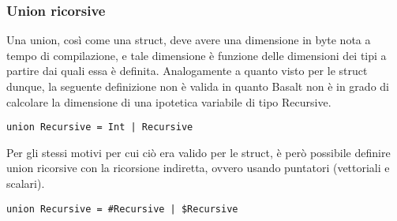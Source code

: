 
\subsubsection{Union ricorsive}
Una union, così come una struct, deve avere una dimensione in byte nota a tempo di compilazione, e tale dimensione è funzione delle dimensioni dei tipi a partire dai quali essa è definita. Analogamente a quanto visto per le struct dunque, la seguente definizione non è valida in quanto Basalt non è in grado di calcolare la dimensione di una ipotetica variabile di tipo Recursive. 

\vspace{0.5cm}
\begin{lstlisting}[frame=single]
union Recursive = Int | Recursive
\end{lstlisting}
\vspace{0.5cm}
 
Per gli stessi motivi per cui ciò era valido per le struct, è però possibile definire union ricorsive con la ricorsione indiretta, ovvero usando puntatori (vettoriali e scalari).

\vspace{0.5cm}
\begin{lstlisting}[frame=single]
union Recursive = #Recursive | $Recursive
\end{lstlisting}
\vspace{0.5cm}